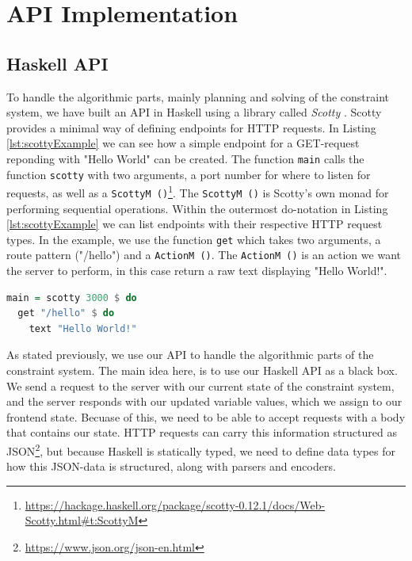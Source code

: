 \documentclass[11pt, a4paper]{article}
\begin{document}
\section{API Implementation}
\label{sec:api}
\subsection{Haskell API}
\label{sec:haskellapi}
To handle the algorithmic parts, mainly planning and solving of the constraint system, we have built an API in Haskell using a library called \textit{Scotty} \cite{scottyArticle, scottyHackage}. Scotty provides a minimal way of defining endpoints for HTTP requests. In Listing \ref{lst:scottyExample} we can see how a simple endpoint for a GET-request reponding with "Hello World" can be created. The function \texttt{main} calls the function \texttt{scotty} with two arguments, a port number for where to listen for requests, as well as a \texttt{ScottyM ()}\footnote{\url{https://hackage.haskell.org/package/scotty-0.12.1/docs/Web-Scotty.html\#t:ScottyM}}. The \texttt{ScottyM ()} is Scotty's own monad for performing sequential operations. Within the outermost do-notation in Listing \ref{lst:scottyExample} we can list endpoints with their respective HTTP request types. In the example, we use the function \texttt{get} which takes two arguments, a route pattern ("/hello") and a \texttt{ActionM ()}. The \texttt{ActionM ()} is an action we want the server to perform, in this case return a raw text displaying "Hello World!".

\begin{lstlisting}[language=haskell, caption={Example of a simple endpoint in Scotty.}, label={lst:scottyExample}]
main = scotty 3000 $ do
  get "/hello" $ do
    text "Hello World!"
\end{lstlisting}

As stated previously, we use our API to handle the algorithmic parts of the constraint system. The main idea here, is to use our Haskell API as a black box. We send a request to the server with our current state of the constraint system, and the server responds with our updated variable values, which we assign to our frontend state. Becuase of this, we need to be able to accept requests with a body that contains our state. HTTP requests can carry this information structured as JSON\footnote{\url{https://www.json.org/json-en.html}}, but because Haskell is statically typed, we need to define data types for how this JSON-data is structured, along with parsers and encoders.
\end{document}
